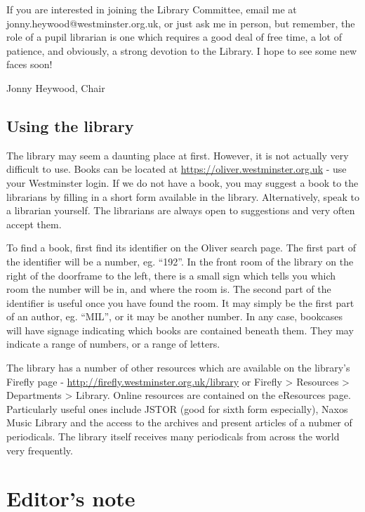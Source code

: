 \documentclass[12pt,a4paper]{report}
\begin{document}
\begin{multicols}{2}
\begin{multicols}{2}
If you are interested in joining the Library Committee, email me at jonny.heywood@westminster.org.uk, or just ask me in person, but remember, the role of a pupil librarian is one which requires a good deal of free time, a lot of patience, and obviously, a strong devotion to the Library. I hope to see some new faces soon!

Jonny Heywood, Chair

\subsection{Using the library}

The library may seem a daunting place at first. However, it is not actually very difficult to use. Books can be located at \url{https://oliver.westminster.org.uk} - use your Westminster login. If we do not have a book, you may suggest a book to the librarians by filling in a short form available in the library. Alternatively, speak to a librarian yourself. The librarians are always open to suggestions and very often accept them.

To find a book, first find its identifier on the Oliver search page. The first part of the identifier will be a number, eg. ``192''. In the front room of the library on the right of the doorframe to the left, there is a small sign which tells you which room the number will be in, and where the room is. The second part of the identifier is useful once you have found the room. It may simply be the first part of an author, eg. ``MIL'', or it may be another number. In any case, bookcases will have signage indicating which books are contained beneath them. They may indicate a range of numbers, or a range of letters.

The library has a number of other resources which are available on the library's Firefly page - \url{http://firefly.westminster.org.uk/library} or Firefly > Resources > Departments > Library. Online resources are contained on the eResources page. Particularly useful ones include JSTOR (good for sixth form especially), Naxos Music Library and the access to the archives and present articles of a nubmer of periodicals. The library itself receives many periodicals from across the world very frequently.

\end{multicols}

\section{Editor's note}


\end{multicols}
\end{document}
